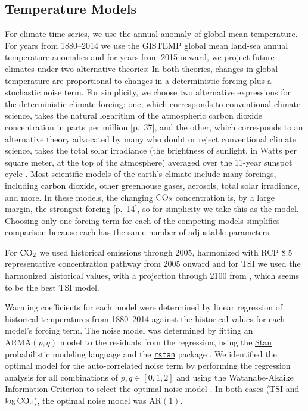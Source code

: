 \documentclass{wscpaperproc}\usepackage[]{graphicx}\usepackage[]{color}
\newcommand{\ARMA}{\text{ARMA}}
\newcommand{\AR}{\text{AR}}
\begin{document}
\subsection{Temperature Models}
\label{sec:temp.models}

For climate time-series, we use the annual anomaly of global mean temperature. For years from 1880--2014 we use the GISTEMP global mean land-sea annual temperature anomalies  and for years from 2015 onward, we project future climates under two alternative theories: In both theories, changes in global temperature are proportional to changes in a deterministic forcing plus a stochastic noise term. For simplicity, we choose two alternative expressions for the deterministic climate forcing: one, which corresponds to conventional climate science, takes the natural logarithm of the atmospheric carbon dioxide concentration in parts per million [p.~37], and the other, which corresponds to an alternative theory advocated by many who doubt or reject conventional climate science, takes the total solar irradiance (the brightness of sunlight, in Watts per square meter, at the top of the atmosphere) averaged over the 11-year sunspot cycle .  Most scientific models of the earth's climate include many forcings, including carbon dioxide, other greenhouse gases, aerosols, total solar irradiance, and more. In these models, the changing $\ce{CO2}$ concentration is, by a large margin, the strongest forcing [p.~14], so for simplicity we take this as the model. Choosing only one forcing term for each of the competing models simplifies comparison because each has the same number of adjustable parameters.

For $\ce{CO2}$ we used historical emissions through 2005, harmonized with RCP 8.5 representative concentration pathway from 2005 onward  and for TSI we used the harmonized historical values, with a projection through 2100 from , which seems to be the best TSI model.

Warming coefficients for each model were determined by linear regression of historical temperatures from 1880--2014 against the historical values for each model's forcing term. The noise model was determined by fitting an $\ARMA(p,q)$ model to the residuals from the regression, using the \href{http://mc-stan.org}{Stan} probabilistic modeling language and the \href{https://cran.r-project.org/web/packages/rstan/}{\texttt{rstan}} package . We identified the optimal model for the auto-correlated noise term by performing the regression analysis for all combinations of $p, q \in [0,1,2]$ and using the Watanabe-Akaike Information Criterion to select the optimal noise model . In both cases (TSI and $\log\ce{CO2}$), the optimal noise model was $\AR(1)$.
\end{document}
